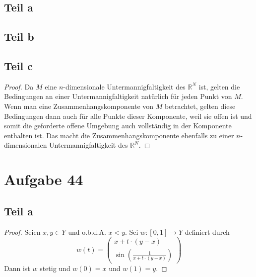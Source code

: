 \documentclass[10pt,a4paper]{article}
\begin{document}
\subsection{Teil a}

\subsection{Teil b}

\subsection{Teil c}
\begin{proof}
  Da $M$ eine $n$-dimensionale Untermannigfaltigkeit des $\mathbb{R}^{N}$ ist, gelten die Bedingungen an einer Untermannigfaltigkeit natürlich für jeden Punkt von $M$.
  Wenn man eine Zusammenhangskomponente von $M$ betrachtet, gelten diese Bedingungen dann auch für alle Punkte dieser Komponente, weil sie offen ist und somit die geforderte offene Umgebung auch vollständig in der Komponente enthalten ist.
  Das macht die Zusammenhangskomponente ebenfalls zu einer $n$-dimensionalen Untermannigfaltigkeit des $\mathbb{R}^{N}$.
\end{proof}

\section{Aufgabe 44}

\subsection{Teil a}
\begin{proof}
  Seien $x, y \in Y$ und o.b.d.A. $x < y$.
  Sei $w : [0, 1] \rightarrow Y$ definiert durch
  \begin{equation}
    w(t) = \begin{pmatrix}
      x + t \cdot (y - x)\\
      \sin(\frac{1}{x + t \cdot (y - x)})
    \end{pmatrix}
  \end{equation}
  Dann ist $w$ stetig und $w(0) = x$ und $w(1) = y$.
\end{proof}
\end{document}
